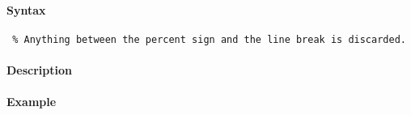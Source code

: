 


	\paragraph{Syntax}
 
 \begin{verbatim}
 % Anything between the percent sign and the line break is discarded.
 \end{verbatim}
 
 \paragraph{Description}
 
 \paragraph{Example}


